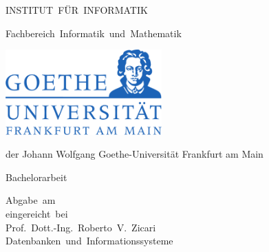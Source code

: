 \begin{titlepage}
\begin{center}

\vspace{6cm}

{\huge INSTITUT~FÜR~INFORMATIK}

\vspace{0.2cm}

{\Large Fachbereich~Informatik~und~Mathematik}

\vspace{2cm}
    \includegraphics[width=6cm]{title/goethe}
\vspace{2.5cm}

{\Large der Johann Wolfgang Goethe-Universität Frankfurt am Main}

{\Large Bachelorarbeit}
\vspace{2.5cm}

{\huge \Title }

\vspace{2.5cm}


{\Large \Author}


\vspace{0.5cm}

  \small Abgabe~am~\Date\\
\vspace{2.5cm}
  \small eingereicht~bei\\\large Prof.~Dott.-Ing.~Roberto~V.~Zicari\\\small Datenbanken~und~Informationssysteme
\end{center}

\end{titlepage}

\cleardoublepage
\large


\cleardoublepage

%

%

\normalsize

\tableofcontents